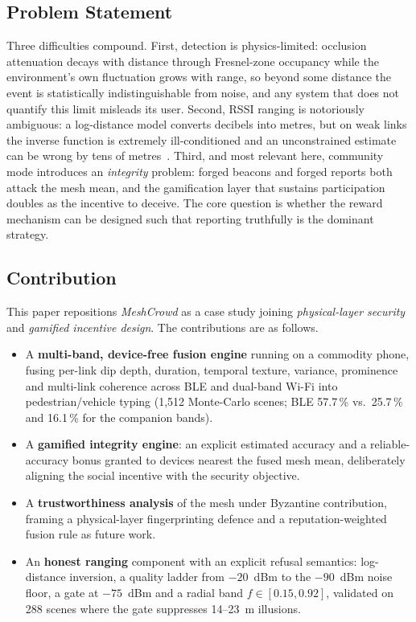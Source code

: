 \documentclass[journal,10pt]{IEEEtran}
\begin{document}
\subsection{Problem Statement}
Three difficulties compound. First, detection is physics-limited: occlusion
attenuation decays with distance through Fresnel-zone occupancy while the
environment's own fluctuation grows with range, so beyond some distance the
event is statistically indistinguishable from noise, and any system that does
not quantify this limit misleads its user. Second, RSSI ranging is notoriously
ambiguous: a log-distance model converts decibels into metres, but on weak
links the inverse function is extremely ill-conditioned and an unconstrained
estimate can be wrong by tens of metres~\cite{ramirez2021,milano2024}. Third,
and most relevant here, community mode introduces an \emph{integrity} problem:
forged beacons and forged reports both attack the mesh mean, and the
gamification layer that sustains participation doubles as the incentive to
deceive. The core question is whether the reward mechanism can be designed such
that reporting truthfully is the dominant strategy.

\subsection{Contribution}
This paper repositions \emph{MeshCrowd} as a case study joining
\emph{physical-layer security} and \emph{gamified incentive design}. The
contributions are as follows.
\begin{itemize}
  \item A \textbf{multi-band, device-free fusion engine} running on a commodity
  phone, fusing per-link dip depth, duration, temporal texture, variance,
  prominence and multi-link coherence across BLE and dual-band Wi-Fi into
  pedestrian/vehicle typing (1,512 Monte-Carlo scenes; BLE 57.7\,\% vs.\
  25.7\,\% and 16.1\,\% for the companion bands).
  \item A \textbf{gamified integrity engine}: an explicit estimated accuracy and
  a reliable-accuracy bonus granted to devices nearest the fused mesh mean,
  deliberately aligning the social incentive with the security objective.
  \item A \textbf{trustworthiness analysis} of the mesh under Byzantine
  contribution, framing a physical-layer fingerprinting defence and a
  reputation-weighted fusion rule as future work.
  \item An \textbf{honest ranging} component with an explicit refusal semantics:
  log-distance inversion, a quality ladder from $-20$~dBm to the $-90$~dBm
  noise floor, a gate at $-75$~dBm and a radial band $f \in [0.15, 0.92]$,
  validated on 288 scenes where the gate suppresses 14--23~m illusions.
\end{itemize}
\end{document}
